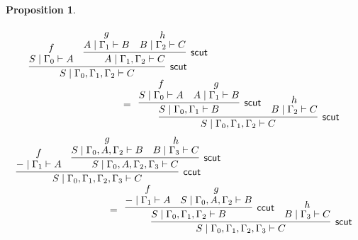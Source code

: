 \documentclass[sn-mathphys-num]{sn-jnl}%
\newcommand{\GG}{\Gamma}
\newcommand{\vd}{\vdash}
\newcommand{\mf}[1]{\mathsf{#1}}
\theoremstyle{thmstyleone}%
\newtheorem{proposition}[theorem]{Proposition}%
\theoremstyle{thmstyletwo}%
\theoremstyle{thmstylethree}%
\begin{document}
\begin{proposition}
\begin{displaymath}
\begin{array}{l}
      \\[30pt]
      \end{array}
    \end{displaymath}
    \begin{displaymath}
      \begin{array}{l}
      \begin{array}{c}
        \infer[\mf{scut}]{S \mid \GG_0 , \GG_1 , \GG_2 \vd C}{
          \deduce{S \mid \GG_0 \vd A}{f}
          &
          \infer[\mf{scut}]{A \mid \GG_1 , \GG_2 \vd C}{
            \deduce{A \mid \GG_1 \vd B}{g}
            &
            \deduce{B \mid \GG_2 \vd C}{h}
          }
        }
      \end{array}
      \\[10pt]
      \qquad \qquad \qquad \qquad \qquad  =
      \begin{array}{c}
        \infer[\mf{scut}]{S \mid \GG_0 , \GG_1 , \GG_2 \vd C}{
          \infer[\mf{scut}]{S \mid \GG_0 , \GG_1 \vd B}{
            \deduce{S \mid \GG_0 \vd A}{f}
            &
            \deduce{A \mid \GG_1 \vd B}{g}
          }
          &
          \deduce{B \mid \GG_2 \vd C}{h}
        }
      \end{array}
      \end{array}
      \end{displaymath}
      \begin{displaymath}
      \begin{array}{l}
      \begin{array}{c}
        \infer[\mf{ccut}]{S \mid \GG_0 , \GG_1 , \GG_2 , \GG_3 \vd C}{
          \deduce{{-} \mid \GG_1 \vd A}{f}
          &
          \infer[\mf{scut}]{S \mid \GG_0 , A , \GG_2 , \GG_3 \vd C}{
            \deduce{S \mid \GG_0 , A , \GG_2 \vd B}{g}
            &
            \deduce{B \mid \GG_3 \vd C}{h}
          }
        }
      \end{array}
      \\[10pt]
      \qquad \qquad \qquad \qquad \qquad  =
      \begin{array}{c}
        \infer[\mf{scut}]{S \mid \GG_0 , \GG_1 , \GG_2 , \GG_3 \vd C}{
          \infer[\mf{ccut}]{S \mid \GG_0 , \GG_1 , \GG_2 \vd B}{
            \deduce{{-} \mid \GG_1 \vd A}{f}
            &
            \deduce{S \mid \GG_0 , A , \GG_2 \vd B}{g}
          }
          &
          \deduce{B \mid \GG_3 \vd C}{h}
        }
      \end{array}
      \end{array}
      \end{displaymath}

\end{proposition}
\end{document}
